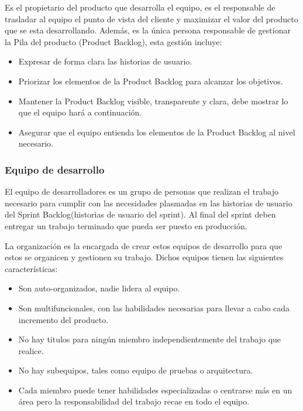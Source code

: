 Es el propietario del producto que desarrolla el equipo, es el responsable de trasladar al equipo el punto de vista del cliente y maximizar
el valor del producto que se esta desarrollando. Además, es la única persona responsable de gestionar la Pila del producto (Product Backlog), 
esta gestión incluye:

\begin{itemize}
	\item Expresar de forma clara las historias de usuario.
	\item Priorizar los elementos de la Product Backlog para alcanzar los objetivos.
	\item Mantener la Product Backlog visible, transparente y clara, debe mostrar lo que el equipo hará a continuación.
	\item Asegurar que el equipo entienda los elementos de la Product Backlog al nivel necesario.
\end{itemize}

\subsubsection{Equipo de desarrollo}

El equipo de desarrolladores es un grupo de personas que realizan el trabajo necesario para cumplir con las
necesidades plasmadas en las historias de usuario del Sprint Backlog(historias de usuario del sprint). Al final 
del sprint deben entregar un trabajo terminado que pueda ser puesto en producción.

La organización es la encargada de crear estos equipos de desarrollo para que estos se organicen y gestionen 
su trabajo. Dichos equipos tienen las siguientes características:

\begin{itemize}
	\item Son auto-organizados, nadie lidera al equipo.
	\item Son multifuncionales, con las habilidades necesarias para llevar a cabo cada incremento del producto.
	\item No hay titulos para ningún miembro independientemente del trabajo que realice.
	\item No hay subequipos, tales como equipo de pruebas o arquitectura.
	\item Cada miembro puede tener habilidades especializadas o centrarse más en un área pero la responsabilidad
	del trabajo recae en todo el equipo.
\end{itemize}

